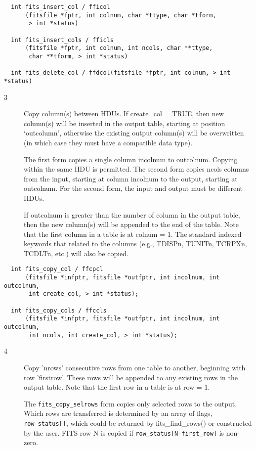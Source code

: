 \documentclass[11pt]{book}
\begin{document}
\begin{verbatim}
  int fits_insert_col / fficol
      (fitsfile *fptr, int colnum, char *ttype, char *tform,
       > int *status)

  int fits_insert_cols / fficls
      (fitsfile *fptr, int colnum, int ncols, char **ttype,
       char **tform, > int *status)

  int fits_delete_col / ffdcol(fitsfile *fptr, int colnum, > int *status)
\end{verbatim}

\begin{description}
\item[3 ] Copy column(s) between HDUs.  If create\_col = TRUE, then
    new column(s) will be inserted in the output table, starting at
    position `outcolumn', otherwise the existing output column(s) will
    be overwritten (in which case they must have a compatible data
    type).

    The first form copies a single column incolnum to outcolnum.
    Copying within the same HDU is permitted.  The second form copies
    ncols columns from the input, starting at column incolnum to the
    output, starting at outcolnum.  For the second form, the input and
    output must be different HDUs.

    If outcolnum is greater than the number of column in the output table, then
    the new column(s) will be appended to the end of the table.
    Note that the first column in a table is at colnum = 1.
    The standard indexed keywords that related to the columns (e.g., TDISPn,
    TUNITn, TCRPXn, TCDLTn, etc.) will also be copied. \label{ffcpcl} \label{ffccls}
\end{description}

\begin{verbatim}
  int fits_copy_col / ffcpcl
      (fitsfile *infptr, fitsfile *outfptr, int incolnum, int outcolnum,
       int create_col, > int *status);

  int fits_copy_cols / ffccls
      (fitsfile *infptr, fitsfile *outfptr, int incolnum, int outcolnum, 
       int ncols, int create_col, > int *status);
\end{verbatim}

\begin{description}
\item[4 ] Copy 'nrows' consecutive rows from one table to another, beginning
    with row 'firstrow'.  These rows will be appended to any existing
    rows in the output table.
   Note that the first row in a table is at row = 1. 

   The \verb|fits_copy_selrows| form copies only selected rows to the output.
   Which rows are transferred is determined by an array of flags, \verb|row_status[]|,
   which could be returned by fits_find_rows() or constructed by the user.
   FITS row N is copied if \verb|row_status[N-first_row]| is non-zero.  
   \label{ffcprw}
\end{description}
\end{document}
